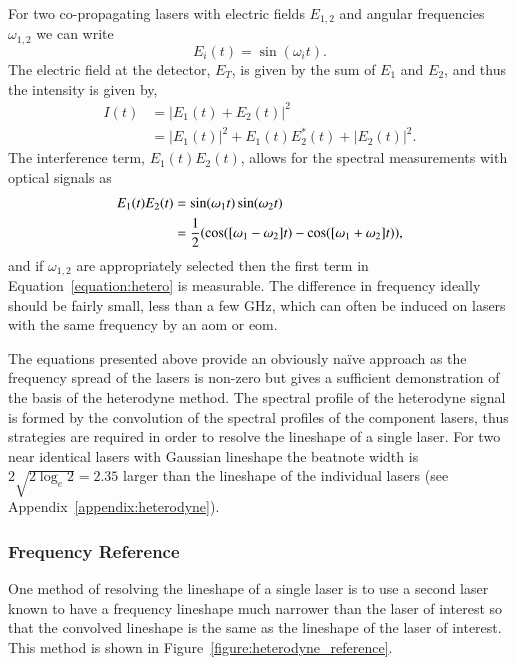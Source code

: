 For two co-propagating lasers with electric fields $E_{1, 2}$ and angular frequencies $\omega_{1, 2}$ we can write
\begin{equation}
E_{i}(t) = \sin(\omega_{i}t).
\end{equation}
The electric field at the detector, $E_T$, is given by the sum of $E_{1}$ and $E_{2}$, and thus the intensity is given by,
\begin{align}
I(t) &= |E_1(t) + E_2(t)|^2\nonumber\\
&= |E_1(t)|^2 + E_1(t)E_2^*(t) + |E_2(t)|^2.
\end{align}
The interference term, $E_1(t)E_2(t)$, allows for the spectral measurements with optical signals as
\begin{align}
E_1(t)E_2(t) &= \sin(\omega_1 t) \sin(\omega_2 t) \notag \\
&= \frac{1}{2} (\cos([\omega_1-\omega_2]t) - \cos([\omega_1+\omega_2]t)), \label{equation:hetero}
\end{align}
and if $\omega_{1,2}$ are appropriately selected then the first term in Equation~\ref{equation:hetero} is measurable.
The difference in frequency ideally should be fairly small, less than a few GHz, which can often be induced on lasers with the same frequency by an \gls{aom} or \gls{eom}.

The equations presented above provide an obviously na\"ive approach as the frequency spread of the lasers is non-zero but gives a sufficient demonstration of the basis of the heterodyne method.
The spectral profile of the heterodyne signal is formed by the convolution of the spectral profiles of the component lasers, thus strategies are required in order to resolve the lineshape of a single laser.
For two near identical lasers with Gaussian lineshape the beatnote width is $2\sqrt{2\log_e2}=2.35$ larger than the lineshape of the individual lasers (see Appendix~\ref{appendix:heterodyne}).

\subsubsection{Frequency Reference}
One method of resolving the lineshape of a single laser is to use a second laser known to have a frequency lineshape much narrower than the laser of interest so that the convolved lineshape is the same as the lineshape of the laser of interest.
This method is shown in Figure~\ref{figure:heterodyne_reference}.

